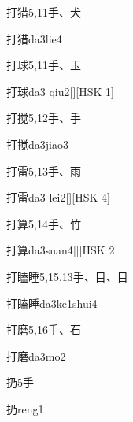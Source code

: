 \begin{entry}{打猎}{5,11}{⼿、⽝}
  \begin{phonetics}{打猎}{da3lie4}
  \end{phonetics}
\end{entry}

\begin{entry}{打球}{5,11}{⼿、⽟}
  \begin{phonetics}{打球}{da3 qiu2}[][HSK 1]
  \end{phonetics}
\end{entry}

\begin{entry}{打搅}{5,12}{⼿、⼿}
  \begin{phonetics}{打搅}{da3jiao3}
  \end{phonetics}
\end{entry}

\begin{entry}{打雷}{5,13}{⼿、⾬}
  \begin{phonetics}{打雷}{da3 lei2}[][HSK 4]
  \end{phonetics}
\end{entry}

\begin{entry}{打算}{5,14}{⼿、⽵}
  \begin{phonetics}{打算}{da3suan4}[][HSK 2]
  \end{phonetics}
\end{entry}

\begin{entry}{打瞌睡}{5,15,13}{⼿、⽬、⽬}
  \begin{phonetics}{打瞌睡}{da3ke1shui4}
  \end{phonetics}
\end{entry}

\begin{entry}{打磨}{5,16}{⼿、⽯}
  \begin{phonetics}{打磨}{da3mo2}
  \end{phonetics}
\end{entry}

\begin{entry}{扔}{5}{⼿}
  \begin{phonetics}{扔}{reng1}
  \end{phonetics}
\end{entry}

